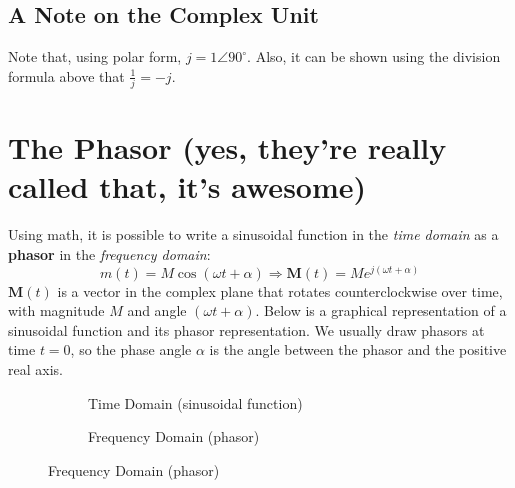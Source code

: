 \documentclass{article}
\begin{document}
\subsection{A Note on the Complex Unit}
Note that, using polar form, $j = 1\angle 90^\circ$. Also, it can be shown using the division formula above that $\frac{1}{j} = -j$.

\section{The Phasor (yes, they're really called that, it's awesome)}
Using math, it is possible to write a sinusoidal function in the \textit{time domain} as a \textbf{phasor} in the \textit{frequency domain}:
$$m(t) = M\cos(\omega t + \alpha) \Rightarrow \bm{M}(t) = Me^{j(\omega t + \alpha)}$$
$\bm{M}(t)$ is a vector in the complex plane that rotates counterclockwise over time, with magnitude $M$ and angle $(\omega t + \alpha)$. Below is a graphical representation of a sinusoidal function and its phasor representation. We usually draw phasors at time $t=0$, so the phase angle $\alpha$ is the angle between the phasor and the positive real axis.

\begin{figure}[H]
\centering
\begin{subfigure}[b]{0.4\textwidth}
\caption*{Time Domain (sinusoidal function)}
\end{subfigure}
\hfill
\begin{subfigure}[b]{0.4\textwidth}
\centering
{}
\caption*{Frequency Domain (phasor)}
\end{subfigure}
\end{figure}
\end{document}
